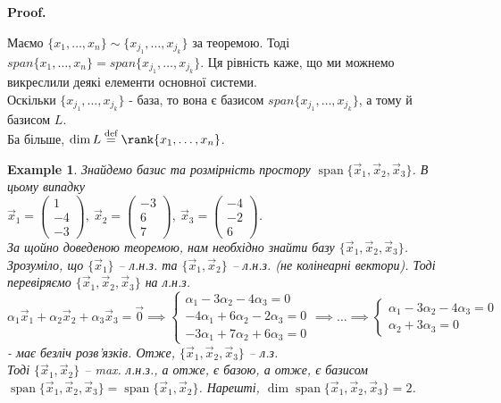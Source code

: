 \documentclass[a4paper, 10pt]{article}
\makeatletter
\theoremstyle{theoremdd}
\newtheorem{example}[theorem]{Example}
\DeclareMathOperator{\linspan}{span}
\renewenvironment{proof}[1][Proof.\\]{\par
\pushQED{\hfill \qed}%
\normalfont \topsep6\p@\@plus6\p@\relax
\trivlist
\item\relax
{\bfseries
#1\@addpunct{.}}\hspace\labelsep\ignorespaces
}{%
\popQED\endtrivlist\@endpefalse
}
\makeatother
\begin{document}
	\begin{proof}
	Маємо $\{x_1,\dots,x_n\} \sim \{x_{j_1},\dots,x_{j_k}\}$ за теоремою. Тоді $span \{x_1,\dots,x_n\} = span \{ x_{j_1},\dots,x_{j_k} \}$. Ця рівність каже, що ми можнемо викреслили деякі елементи основної системи.\\
	Оскільки $\{x_{j_1},\dots,x_{j_k}\}$ - база, то вона є базисом $span \{ x_{j_1},\dots,x_{j_k} \}$, а тому й базисом $L$.\\
	Ба більше, $\dim L \overset{\text{def}}{=} \rank \{x_1,\dots,x_n\}$.
	\end{proof}
	\fi
	
	\begin{example}
	Знайдемо базис та розмірність простору $\linspan \{ \vec{x}_1, \vec{x}_2, \vec{x}_3 \}$. В цьому випадку\\
	$\vec{x}_1 = \begin{pmatrix}
	1 \\ -4 \\ -3
	\end{pmatrix},\ \vec{x}_2 = \begin{pmatrix}
	-3 \\ 6 \\ 7
	\end{pmatrix},\ \vec{x}_3 = \begin{pmatrix}
	-4 \\ -2 \\ 6
	\end{pmatrix}$.\\
	За щойно доведеною теоремою, нам необхідно знайти базу $\{\vec{x}_1,\vec{x}_2,\vec{x}_3 \}$. Зрозуміло, що $\{\vec{x}_1\}$ -- л.н.з. та $\{\vec{x}_1, \vec{x}_2\}$ -- л.н.з. (не колінеарні вектори). Тоді перевіряємо $\{\vec{x}_1,\vec{x}_2,\vec{x}_3 \}$ на л.н.з.\\
	$\alpha_1 \vec{x}_1 + \alpha_2 \vec{x}_2 + \alpha_3 \vec{x}_3 = \vec{0} \implies 		\begin{cases}
	\alpha_1 - 3 \alpha_2 - 4 \alpha_3 = 0 \\
	-4\alpha_1 + 6 \alpha_2 - 2 \alpha_3 = 0 \\
	-3\alpha_1 + 7 \alpha_2 + 6 \alpha_3 = 0
	\end{cases} \implies \dots \implies \begin{cases} \alpha_1 - 3 \alpha_2 - 4 \alpha_3 = 0 \\ \alpha_2 + 3 \alpha_3 = 0 \end{cases}$ - має безліч розв'язків. Отже, $\{\vec{x}_1,\vec{x}_2,\vec{x}_3\}$ -- л.з.\\
	Тоді $\{\vec{x}_1,\vec{x}_2\}$ -- max. л.н.з., а отже, є базою, а отже, є базисом $\linspan \{\vec{x}_1,\vec{x}_2,\vec{x}_3 \} = \linspan \{\vec{x}_1,\vec{x}_2 \}$. Нарешті, $\dim \linspan \{\vec{x}_1,\vec{x}_2,\vec{x}_3\} = 2$.
	\end{example}
	
\end{document}
